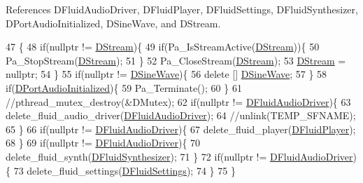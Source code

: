 References D\+Fluid\+Audio\+Driver, D\+Fluid\+Player, D\+Fluid\+Settings, D\+Fluid\+Synthesizer, D\+Port\+Audio\+Initialized, D\+Sine\+Wave, and D\+Stream.


\begin{DoxyCode}
47                                        \{
48     \textcolor{keywordflow}{if}(\textcolor{keyword}{nullptr} != \hyperlink{classCSoundLibraryMixer_ad992cd6202130db3a45ca695eca34625}{DStream})\{
49         \textcolor{keywordflow}{if}(Pa\_IsStreamActive(\hyperlink{classCSoundLibraryMixer_ad992cd6202130db3a45ca695eca34625}{DStream}))\{
50             Pa\_StopStream(\hyperlink{classCSoundLibraryMixer_ad992cd6202130db3a45ca695eca34625}{DStream});
51         \}
52         Pa\_CloseStream(\hyperlink{classCSoundLibraryMixer_ad992cd6202130db3a45ca695eca34625}{DStream});
53         \hyperlink{classCSoundLibraryMixer_ad992cd6202130db3a45ca695eca34625}{DStream} = \textcolor{keyword}{nullptr};
54     \}
55     \textcolor{keywordflow}{if}(\textcolor{keyword}{nullptr} != \hyperlink{classCSoundLibraryMixer_a7d696c93362c862bfc651a28ee8f67cf}{DSineWave})\{
56         \textcolor{keyword}{delete} [] \hyperlink{classCSoundLibraryMixer_a7d696c93362c862bfc651a28ee8f67cf}{DSineWave};    
57     \}
58     \textcolor{keywordflow}{if}(\hyperlink{classCSoundLibraryMixer_a1c78419f5e6cfdf4bc879bb5eedf52f0}{DPortAudioInitialized})\{
59         Pa\_Terminate();
60     \}
61     \textcolor{comment}{//pthread\_mutex\_destroy(&DMutex);}
62     \textcolor{keywordflow}{if}(\textcolor{keyword}{nullptr} != \hyperlink{classCSoundLibraryMixer_a4ba4ccc9c6603c98a5432042e779977e}{DFluidAudioDriver})\{
63         delete\_fluid\_audio\_driver(\hyperlink{classCSoundLibraryMixer_a4ba4ccc9c6603c98a5432042e779977e}{DFluidAudioDriver});
64         \textcolor{comment}{//unlink(TEMP\_SFNAME);}
65     \}
66     \textcolor{keywordflow}{if}(\textcolor{keyword}{nullptr} != \hyperlink{classCSoundLibraryMixer_a4ba4ccc9c6603c98a5432042e779977e}{DFluidAudioDriver})\{
67         delete\_fluid\_player(\hyperlink{classCSoundLibraryMixer_a6773ddf83ef86bc27598f6c5cee61d9c}{DFluidPlayer});
68     \}
69     \textcolor{keywordflow}{if}(\textcolor{keyword}{nullptr} != \hyperlink{classCSoundLibraryMixer_a4ba4ccc9c6603c98a5432042e779977e}{DFluidAudioDriver})\{
70         delete\_fluid\_synth(\hyperlink{classCSoundLibraryMixer_a6c1663c381dbf2aa18c82a23141f409c}{DFluidSynthesizer});
71     \}
72     \textcolor{keywordflow}{if}(\textcolor{keyword}{nullptr} != \hyperlink{classCSoundLibraryMixer_a4ba4ccc9c6603c98a5432042e779977e}{DFluidAudioDriver})\{
73         delete\_fluid\_settings(\hyperlink{classCSoundLibraryMixer_a2c6fb394c8bed99adb019576dc7f6eee}{DFluidSettings});
74     \}
75 \}
\end{DoxyCode}


